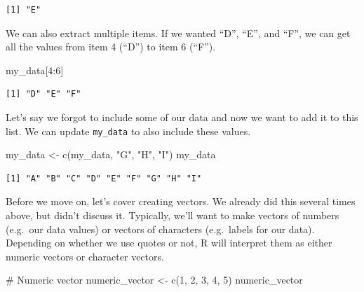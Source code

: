 \documentclass[
  letterpaper,
  DIV=11,
  numbers=noendperiod]{scrreprt}
\newenvironment{Shaded}{\begin{snugshade}}{\end{snugshade}}
\newcommand{\CommentTok}[1]{\textcolor[rgb]{0.37,0.37,0.37}{#1}}
\newcommand{\DecValTok}[1]{\textcolor[rgb]{0.68,0.00,0.00}{#1}}
\newcommand{\FunctionTok}[1]{\textcolor[rgb]{0.28,0.35,0.67}{#1}}
\newcommand{\NormalTok}[1]{\textcolor[rgb]{0.00,0.23,0.31}{#1}}
\newcommand{\OtherTok}[1]{\textcolor[rgb]{0.00,0.23,0.31}{#1}}
\newcommand{\SpecialCharTok}[1]{\textcolor[rgb]{0.37,0.37,0.37}{#1}}
\newcommand{\StringTok}[1]{\textcolor[rgb]{0.13,0.47,0.30}{#1}}
\begin{document}
\begin{verbatim}
[1] "E"
\end{verbatim}

We can also extract multiple items. If we wanted ``D'', ``E'', and
``F'', we can get all the values from item 4 (``D'') to item 6 (``F'').

\begin{Shaded}
\begin{Highlighting}[]
\NormalTok{my\_data[}\DecValTok{4}\SpecialCharTok{:}\DecValTok{6}\NormalTok{]}
\end{Highlighting}
\end{Shaded}

\begin{verbatim}
[1] "D" "E" "F"
\end{verbatim}

Let's say we forgot to include some of our data and now we want to add
it to this list. We can update \texttt{my\_data} to also include these
values.

\begin{Shaded}
\begin{Highlighting}[]
\NormalTok{my\_data }\OtherTok{\textless{}{-}} \FunctionTok{c}\NormalTok{(my\_data, }\StringTok{"G"}\NormalTok{, }\StringTok{"H"}\NormalTok{, }\StringTok{"I"}\NormalTok{)}
\NormalTok{my\_data}
\end{Highlighting}
\end{Shaded}

\begin{verbatim}
[1] "A" "B" "C" "D" "E" "F" "G" "H" "I"
\end{verbatim}

Before we move on, let's cover creating vectors. We already did this
several times above, but didn't discuss it. Typically, we'll want to
make vectors of numbers (e.g.~our data values) or vectors of characters
(e.g.~labels for our data). Depending on whether we use quotes or not, R
will interpret them as either numeric vectors or character vectors.

\begin{Shaded}
\begin{Highlighting}[]
\CommentTok{\# Numeric vector}
\NormalTok{numeric\_vector }\OtherTok{\textless{}{-}} \FunctionTok{c}\NormalTok{(}\DecValTok{1}\NormalTok{, }\DecValTok{2}\NormalTok{, }\DecValTok{3}\NormalTok{, }\DecValTok{4}\NormalTok{, }\DecValTok{5}\NormalTok{)}
\NormalTok{numeric\_vector}
\end{Highlighting}
\end{Shaded}
\end{document}
